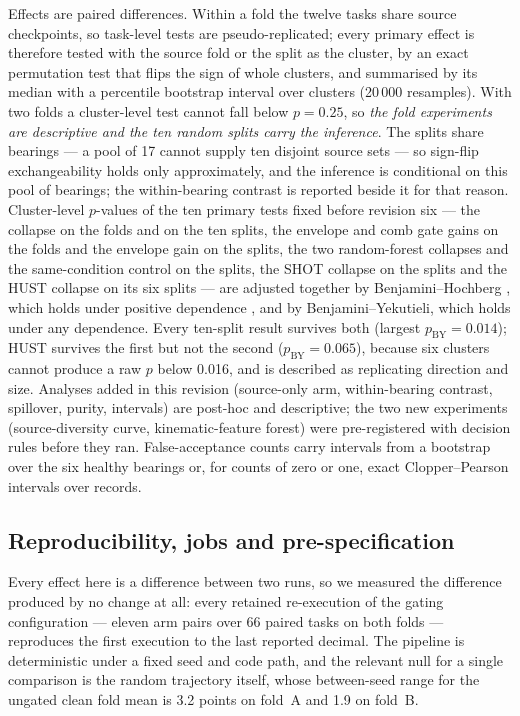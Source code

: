 Effects are paired differences. Within a fold the twelve tasks share source checkpoints, so task-level tests are
pseudo-replicated; every primary effect is therefore tested with the source fold or the split as the cluster, by an exact
permutation test that flips the sign of whole clusters, and summarised by its median with a percentile bootstrap interval
over clusters (20\,000 resamples). With two folds a cluster-level test cannot fall below $p = 0.25$, so \emph{the fold
experiments are descriptive and the ten random splits carry the inference}. The splits share bearings --- a pool of 17
cannot supply ten disjoint source sets --- so sign-flip exchangeability holds only approximately, and the inference is
conditional on this pool of bearings; the within-bearing contrast is reported beside it for that reason. Cluster-level
$p$-values of the ten primary tests fixed before revision six --- the collapse on the folds and on the ten splits, the
envelope and comb gate gains on the folds and the envelope gain on the splits, the two random-forest collapses and the
same-condition control on the splits, the SHOT collapse on the splits and the HUST collapse on its six splits --- are
adjusted together by Benjamini--Hochberg \cite{benjamini1995}, which holds under positive dependence \cite{benjamini2001}, and
by Benjamini--Yekutieli, which holds under any dependence. Every ten-split result survives both (largest
$p_{\mathrm{BY}} = 0.014$); HUST survives the first but not the second ($p_{\mathrm{BY}} = 0.065$), because six clusters
cannot produce a raw $p$ below 0.016, and is described as replicating direction and size. Analyses added in this
revision (source-only arm, within-bearing contrast, spillover, purity, intervals) are post-hoc and descriptive; the two new
experiments (source-diversity curve, kinematic-feature forest) were pre-registered with decision rules before they ran.
False-acceptance counts carry intervals from a bootstrap over the six healthy bearings or, for counts of zero or one, exact
Clopper--Pearson intervals over records.

\subsection{Reproducibility, jobs and pre-specification}

Every effect here is a difference between two runs, so we measured the difference produced by no change at all: every
retained re-execution of the gating configuration --- eleven arm pairs over 66 paired tasks on both folds --- reproduces the
first execution to the last reported decimal. The pipeline is deterministic under a fixed seed and code path, and the
relevant null for a single comparison is the random trajectory itself, whose between-seed range for the ungated clean fold
mean is 3.2 points on fold~A and 1.9 on fold~B.

